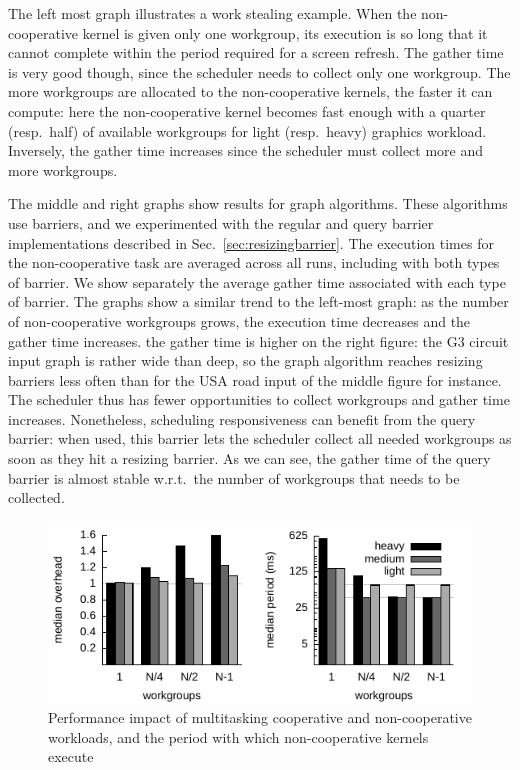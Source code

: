 \documentclass[sigconf]{acmart}
\newcommand{\mysec}{Sec.~}
\begin{document}
{The left most graph illustrates a work
stealing example.  When the non-cooperative kernel is given only one
workgroup, its execution is so long that it cannot complete within the
period required for a screen refresh. The gather time is very good
though, since the scheduler needs to collect only one workgroup.  The
more workgroups are allocated to the non-cooperative kernels, the
faster it can compute: here the non-cooperative kernel becomes fast
enough with a quarter (resp.\ half) of available workgroups for light
(resp.\ heavy) graphics workload. Inversely, the gather time increases
since the scheduler must collect more and more workgroups.

The middle and right graphs show results for graph algorithms.  These
algorithms use barriers, and we experimented with the regular and
query barrier implementations described in
\mysec\ref{sec:resizingbarrier}.  The execution times for the
non-cooperative task are averaged across all runs, including with both
types of barrier.  We show separately the average gather time
associated with each type of barrier.  The graphs show a similar trend
to the left-most graph: as the number of non-cooperative workgroups
grows, the execution time decreases and the gather time
increases.%
%
the gather time is higher on the right figure: the G3 circuit input
graph is rather wide than deep, so the graph algorithm reaches
resizing barriers less often than for the USA road input of the middle
figure for instance. The scheduler thus has fewer opportunities to
collect workgroups and gather time increases. Nonetheless, scheduling
responsiveness can benefit from the query barrier: when used, this
barrier lets the scheduler collect all needed workgroups as soon as
they hit a resizing barrier. 
As we can see, the gather time of the
query barrier is almost stable w.r.t.\ the number of workgroups that
needs to be collected.


\begin{figure}
\includegraphics[width=\columnwidth]{heavy.pdf}
\caption{Performance impact of multitasking cooperative and non-cooperative workloads, and the period with which non-cooperative kernels execute}\label{fig:performance}
\end{figure}


}
\end{document}
